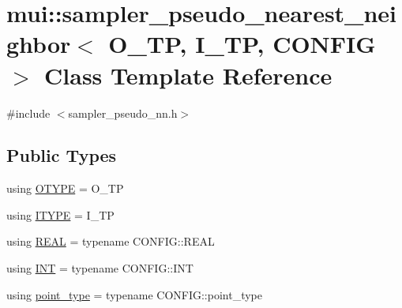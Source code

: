 \hypertarget{classmui_1_1sampler__pseudo__nearest__neighbor}{}\section{mui\+:\+:sampler\+\_\+pseudo\+\_\+nearest\+\_\+neighbor$<$ O\+\_\+\+TP, I\+\_\+\+TP, C\+O\+N\+F\+IG $>$ Class Template Reference}
\label{classmui_1_1sampler__pseudo__nearest__neighbor}


{\ttfamily \#include $<$sampler\+\_\+pseudo\+\_\+nn.\+h$>$}

\subsection*{Public Types}
\begin{DoxyCompactItemize}
\item 
using \hyperlink{classmui_1_1sampler__pseudo__nearest__neighbor_a4e8f628c3c9ba7a0a265f19077c32983}{O\+T\+Y\+PE} = O\+\_\+\+TP
\item 
using \hyperlink{classmui_1_1sampler__pseudo__nearest__neighbor_a02306f1df2d4fa21d58a35b4466a3ac5}{I\+T\+Y\+PE} = I\+\_\+\+TP
\item 
using \hyperlink{classmui_1_1sampler__pseudo__nearest__neighbor_ab053986c2affe4523f82f14e832a259e}{R\+E\+AL} = typename C\+O\+N\+F\+I\+G\+::\+R\+E\+AL
\item 
using \hyperlink{classmui_1_1sampler__pseudo__nearest__neighbor_aba0be7385a6c5cd5c6a77321399b86c4}{I\+NT} = typename C\+O\+N\+F\+I\+G\+::\+I\+NT
\item 
using \hyperlink{classmui_1_1sampler__pseudo__nearest__neighbor_ab639810d9409c0e3fea48d950d6cfe59}{point\+\_\+type} = typename C\+O\+N\+F\+I\+G\+::point\+\_\+type
\end{DoxyCompactItemize}

